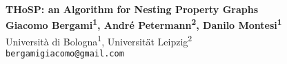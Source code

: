 \documentclass[a0,portrait]{a0poster}
\begin{document}


\begin{minipage}[b]{0.75\linewidth}
\Huge \color{NavyBlue} \textbf{THoSP: an Algorithm for Nesting Property Graphs} \color{Black}\\ %
\huge \textbf{Giacomo Bergami\textsuperscript{1}, Andr\'e Petermann\textsuperscript{2}, Danilo Montesi\textsuperscript{1}}\\[0.5cm] %
\huge Universit\`a di Bologna\textsuperscript{1}, Universit\"at Leipzig\textsuperscript{2}\\[0.4cm] %
\Large \texttt{bergamigiacomo@gmail.com}\\
\end{minipage}
%

\vspace{1cm} %

\end{document}
